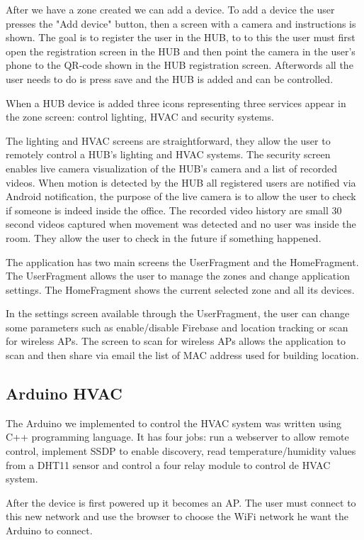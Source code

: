 After we have a zone created we can add a device. To add a device the user presses the "Add device" button, then a screen with a camera and instructions is shown. The goal is to register the user in the HUB, to to this the user must first open the registration screen in the HUB and then point the camera in the user's phone to the QR-code shown in the HUB registration screen. Afterwords all the user needs to do is press save and the HUB is added and can be controlled.


When a HUB device is added three icons representing three services appear in the zone screen: control lighting, \ac{HVAC} and security systems.

The lighting and \ac{HVAC} screens are straightforward, they allow the user to remotely control a HUB's lighting and \ac{HVAC} systems. The security screen enables live camera visualization of the HUB's camera and a list of recorded videos. When motion is detected by the HUB all registered users are notified via Android notification, the purpose of the live camera is to allow the user to check if someone is indeed inside the office. The recorded video history are small 30 second videos captured when movement was detected and no user was inside the room. They allow the user to check in the future if something happened.


The application has two main screens the UserFragment and the HomeFragment. The UserFragment allows the user to manage the zones and change application settings. The HomeFragment shows the current selected zone and all its devices.

In the settings screen available through the UserFragment, the user can change some parameters such as enable/disable Firebase and location tracking or scan for wireless APs. The screen to scan for wireless APs allows the application to scan and then share via email the list of \ac{MAC address} used for building location.


\subsection{Arduino HVAC}


The Arduino we implemented to control the HVAC system was written using C++ programming language. It has four jobs: run a webserver to allow remote control, implement \ac{SSDP} to enable discovery, read temperature/humidity values from a DHT11 sensor and control a four relay module to control de HVAC system.

After the device is first powered up it becomes an \ac{AP}. The user must connect to this new network and use the browser to choose the \ac{WiFi} network he want the Arduino to connect.


